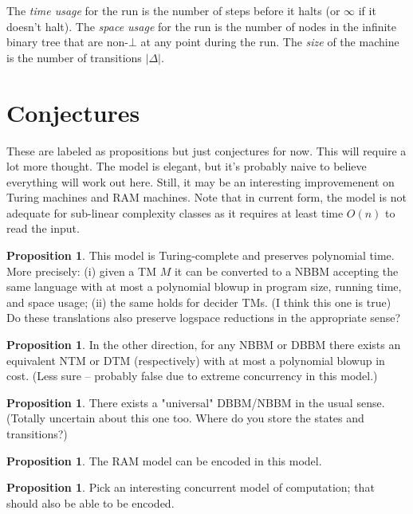 \documentclass{article}
\theoremstyle{definition}
\newtheorem{prop}[thm]{Proposition}
\begin{document}
The \emph{time usage} for the run is the number of steps before it halts (or $\infty$ if it doesn't halt).
The \emph{space usage} for the run is the number of nodes in the infinite binary tree that are non-$\bot$ at any point during the run.
The \emph{size} of the machine is the number of transitions $|\Delta|$.

\section{Conjectures}

These are labeled as propositions but just conjectures for now.
This will require a lot more thought.
The model is elegant, but it's probably naive to believe everything will work out here.
Still, it may be an interesting improvemenent on Turing machines and RAM machines.
Note that in current form, the model is not adequate for sub-linear complexity classes as it requires at least time $O(n)$ to read the input.

\begin{prop}
This model is Turing-complete and preserves polynomial time.
More precisely: (i) given a TM $M$ it can be converted to a NBBM accepting the same language with at most a polynomial blowup in program size, running time, and space usage; (ii) the same holds for decider TMs.
(I think this one is true)
Do these translations also preserve logspace reductions in the appropriate sense?
\end{prop}

\begin{prop}
In the other direction, for any NBBM or DBBM there exists an equivalent NTM or DTM (respectively) with at most a polynomial blowup in cost.
(Less sure -- probably false due to extreme concurrency in this model.)
\end{prop}

\begin{prop}
There exists a "universal" DBBM/NBBM in the usual sense.
(Totally uncertain about this one too. Where do you store the states and transitions?)
\end{prop}

\begin{prop}
The RAM model can be encoded in this model.
\end{prop}

\begin{prop}
Pick an interesting concurrent model of computation; that should also be able to be encoded.
\end{prop}
\end{document}
